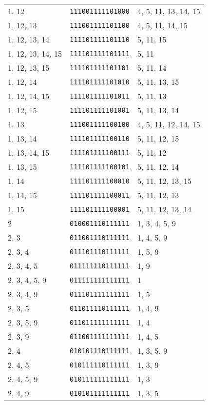 \documentclass[a4paper,12pt]{article}
\begin{document}
\begin{longtable}{l|l|l}
        1, 12&\texttt{111001111101000}&4, 5, 11, 13, 14, 15\\
        1, 12, 13&\texttt{111001111101100}&4, 5, 11, 14, 15\\
        1, 12, 13, 14&\texttt{111101111101110}&5, 11, 15\\
        1, 12, 13, 14, 15&\texttt{111101111101111}&5, 11\\
        1, 12, 13, 15&\texttt{111101111101101}&5, 11, 14\\
        1, 12, 14&\texttt{111101111101010}&5, 11, 13, 15\\
        1, 12, 14, 15&\texttt{111101111101011}&5, 11, 13\\
        1, 12, 15&\texttt{111101111101001}&5, 11, 13, 14\\
        1, 13&\texttt{111001111100100}&4, 5, 11, 12, 14, 15\\
        1, 13, 14&\texttt{111101111100110}&5, 11, 12, 15\\
        1, 13, 14, 15&\texttt{111101111100111}&5, 11, 12\\
        1, 13, 15&\texttt{111101111100101}&5, 11, 12, 14\\
        1, 14&\texttt{111101111100010}&5, 11, 12, 13, 15\\
        1, 14, 15&\texttt{111101111100011}&5, 11, 12, 13\\
        1, 15&\texttt{111101111100001}&5, 11, 12, 13, 14\\
        2&\texttt{010001110111111}&1, 3, 4, 5, 9\\
        2, 3&\texttt{011001110111111}&1, 4, 5, 9\\
        2, 3, 4&\texttt{011101110111111}&1, 5, 9\\
        2, 3, 4, 5&\texttt{011111110111111}&1, 9\\
        2, 3, 4, 5, 9&\texttt{011111111111111}&1\\
        2, 3, 4, 9&\texttt{011101111111111}&1, 5\\
        2, 3, 5&\texttt{011011110111111}&1, 4, 9\\
        2, 3, 5, 9&\texttt{011011111111111}&1, 4\\
        2, 3, 9&\texttt{011001111111111}&1, 4, 5\\
        2, 4&\texttt{010101110111111}&1, 3, 5, 9\\
        2, 4, 5&\texttt{010111110111111}&1, 3, 9\\
        2, 4, 5, 9&\texttt{010111111111111}&1, 3\\
        2, 4, 9&\texttt{010101111111111}&1, 3, 5\\

\end{longtable}
\end{document}
